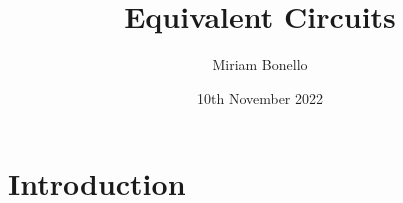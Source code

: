 \documentclass[12pt, a4paper]{article}
\begin{document}
\justifying 
\title{Equivalent Circuits}
\author{Miriam Bonello}
\date{10th November 2022}

\maketitle 

\begin{abstract}
\end{abstract}

\section*{Introduction}\label{section-introduction}
{}
\end{document}
